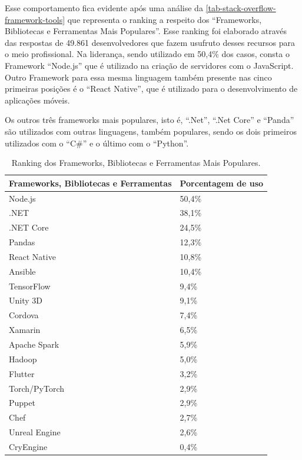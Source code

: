 Esse comportamento fica evidente após uma análise da \autoref{tab-stack-overflow-framework-tools} que representa o ranking a respeito dos ``Frameworks, Bibliotecas e Ferramentas Mais Populares''. Esse ranking foi elaborado através das respostas de 49.861 desenvolvedores que fazem usufruto desses recursos para o meio profissional. Na liderança, sendo utilizado em 50,4\% dos casos, consta o Framework ``Node.js'' que é utilizado na criação de servidores com o JavaScript. Outro Framework para essa mesma linguagem também presente nas cinco primeiras posições é o ``React Native'', que é utilizado para o desenvolvimento de aplicações móveis.

Os outros três frameworks mais populares, isto é, ``.Net'', ``.Net Core'' e ``Panda'' são utilizados com outras linguagens, também populares, sendo os dois primeiros utilizados com o ``C\#'' e o último com o ``Python''.

\begin{table}[htb]
\ABNTEXfontereduzida
\caption[Ranking dos Frameworks, Bibliotecas e Ferramentas Mais Populares]{Ranking dos Frameworks, Bibliotecas e Ferramentas Mais Populares.}
\label{tab-stack-overflow-framework-tools}
\begin{tabular}{p{5cm}|p{4cm}}
   \textbf{Frameworks, Bibliotecas e Ferramentas} & \textbf{Porcentagem de uso}  \\
    \hline
    Node.js & 50,4\%  \\
    \hline
    .NET & 38,1\%  \\
    \hline
    .NET Core & 24,5\%  \\
    \hline
    Pandas & 12,3\%  \\
    \hline
    React Native & 10,8\%  \\
    \hline
    Ansible & 10,4\%  \\
    \hline
    TensorFlow & 9,4\%  \\
    \hline
    Unity 3D & 9,1\%  \\
    \hline
    Cordova & 7,4\%  \\
    \hline
    Xamarin & 6,5\%  \\
    \hline
    Apache Spark & 5,9\%  \\
    \hline
    Hadoop & 5,0\%  \\
    \hline
    Flutter & 3,2\%  \\
    \hline
    Torch/PyTorch & 2,9\%  \\
    \hline
    Puppet & 2,9\%  \\
    \hline
    Chef & 2,7\%  \\
    \hline
    Unreal Engine & 2,6\%  \\
    \hline
    CryEngine & 0,4\%  \\
    
\end{tabular}
\end{table}

